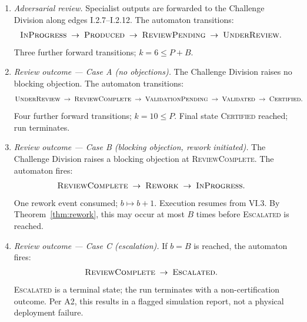 \documentclass[12pt]{article}
\theoremstyle{definition}
\begin{document}
\begin{enumerate}
    \item[VI.4] \emph{Adversarial review.}  Specialist outputs are
                forwarded to the Challenge Division along edges
                I.2.7--I.2.12.  The automaton transitions:
                \begin{align}
                    \textsc{InProgress}
                    &\;\to\; \textsc{Produced}
                    \;\to\; \textsc{ReviewPending}
                    \;\to\; \textsc{UnderReview}.
                    \notag
                \end{align}
                Three further forward transitions; $k = 6 \leq P + B$.
                \checkmark

    \item[VI.5] \emph{Review outcome --- Case A (no objections).}
                The Challenge Division raises no blocking objection.
                The automaton transitions:
                \begin{align}
                    \textsc{UnderReview}
                    &\;\to\; \textsc{ReviewComplete}
                    \;\to\; \textsc{ValidationPending}
                    \;\to\; \textsc{Validated}
                    \;\to\; \textsc{Certified}.
                    \notag
                \end{align}
                Four further forward transitions; $k = 10 \leq P$.
                Final state \textsc{Certified} reached; run terminates.
                \checkmark

    \item[VI.6] \emph{Review outcome --- Case B (blocking objection,
                rework initiated).}  The Challenge Division raises a
                blocking objection at \textsc{ReviewComplete}.
                The automaton fires:
                \begin{align}
                    \textsc{ReviewComplete}
                    &\;\to\; \textsc{Rework}
                    \;\to\; \textsc{InProgress}.
                    \notag
                \end{align}
                One rework event consumed; $b \mapsto b + 1$.
                Execution resumes from VI.3.  By
                Theorem~\ref{thm:rework}, this may occur at most
                $B$ times before \textsc{Escalated} is reached.
                \checkmark

    \item[VI.7] \emph{Review outcome --- Case C (escalation).}
                If $b = B$ is reached, the automaton fires:
                \begin{align}
                    \textsc{ReviewComplete}
                    &\;\to\; \textsc{Escalated}.
                    \notag
                \end{align}
                \textsc{Escalated} is a terminal state; the run
                terminates with a non-certification outcome.  Per A2,
                this results in a flagged simulation report, not a
                physical deployment failure. \checkmark


\end{enumerate}
\end{document}
